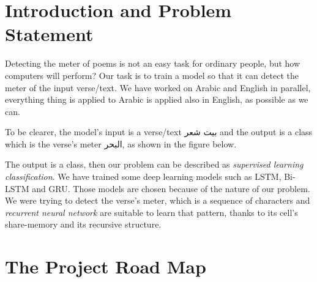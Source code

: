 \documentclass[12pt]{article}
\begin{document}




\section{Introduction and Problem Statement}
Detecting the meter of poems is not an easy task for ordinary people, but how
computers will perform? Our task is to train a model so that it can detect the
meter of the input verse/text.
We have worked on Arabic and English in parallel, everything thing is applied to
Arabic is applied also in English, as possible as we can.

To be clearer, the model's input is a verse/text \textarabic{بيت شعر} and the
output is a class which is the verse's meter \textarabic{البحر}, as shown in the
figure below.


\begin{center}
\end{center}

The output is a class, then our problem can be described as \textit{supervised
learning  classification}.  We have trained some deep learning models such as
LSTM, Bi-LSTM and GRU.  Those models are chosen because of the nature of our
problem. We were trying to detect the verse's meter, which is a sequence of
characters and \textit{recurrent neural network} are suitable  to learn that
pattern, thanks to its cell's share-memory and its recursive structure.


\section{The Project Road Map}

\begin{center}
\end{center}
\end{document}
